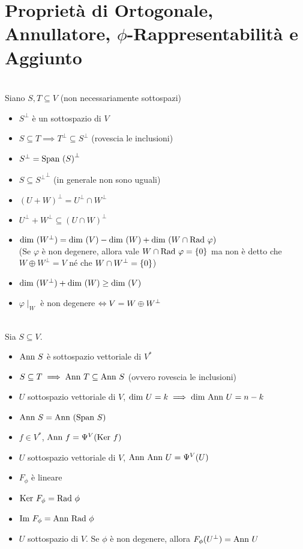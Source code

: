 \documentclass[a4paper,NoNotes,GeneralMath]{stdmdoc}
\begin{document}
	\section*{Proprietà di Ortogonale, Annullatore, $\phi$-Rappresentabilità e Aggiunto}
	 \\ Siano $S, T \subseteq V$ (non necessariamente sottospazi)
	\begin{itemize}
		\item $S^\bot$ è un sottospazio di $V$
		\item $S \subseteq T \implies T^\bot \subseteq S^\bot$ (rovescia le inclusioni)
		\item $S^\bot = {\mbox{Span }(S)}^\bot$
		\item $S \subseteq {S^\bot}^\bot$ (in generale non sono uguali)
		\item $(U + W)^\bot = U^\bot \cap W^\bot$
		\item $U^\bot + W^\bot \subseteq (U \cap W)^\bot$
		\item $\mbox{dim }(W^\bot) = \mbox{dim }(V) - \mbox{dim }(W) + \mbox{dim }(W \cap \mbox{Rad }\varphi)$ \\ (Se $\varphi$ è non degenere, allora vale $W \cap \mbox{Rad } \varphi = \{0\}$ ma non è detto che $W \oplus W^\bot = V$ né che $W \cap W^\bot = \{0\}$)
		\item $\mbox{dim }(W^\bot) + \mbox{dim }(W) \ge \mbox{dim }(V)$
		\item $\varphi\mid_W$ è non degenere $\Leftrightarrow V = W \oplus W^\bot$
	\end{itemize}

	 \\ Sia $S \subseteq V$.
	\begin{itemize}
		\item $\mbox{Ann } S$ è sottospazio vettoriale di $V^{*}$
		\item $S \subseteq T \implies \mbox{Ann } T \subseteq \mbox{Ann } S$ (ovvero rovescia le inclusioni)
		\item $U$ sottospazio vettoriale di $V$, $\mbox{dim } U = k \implies \mbox{dim } \mbox{Ann } U = n - k$
		\item $\mbox{Ann } S = \mbox{Ann } (\mbox{Span } S)$
		\item $f \in V^{*}$, $\mbox{Ann } f = \Psi^{V}(\mbox{Ker } f)$
		\item $U$ sottospazio vettoriale di $V$, $\mbox{Ann } \mbox{Ann } U = \Psi^{V} (U)$
	\end{itemize}

	\begin{itemize}
		\item $F_{\phi}$ è lineare
		\item $\mbox{Ker } F_{\phi} = \mbox{Rad } \phi$
		\item $\mbox{Im } F_{\phi} = \mbox{Ann } \mbox{Rad } \phi$
		\item $U$ sottospazio di $V$. Se $\phi$ è non degenere, allora $F_{\phi}(U^\bot) = \mbox{Ann } U$
	\end{itemize}
\end{document}
